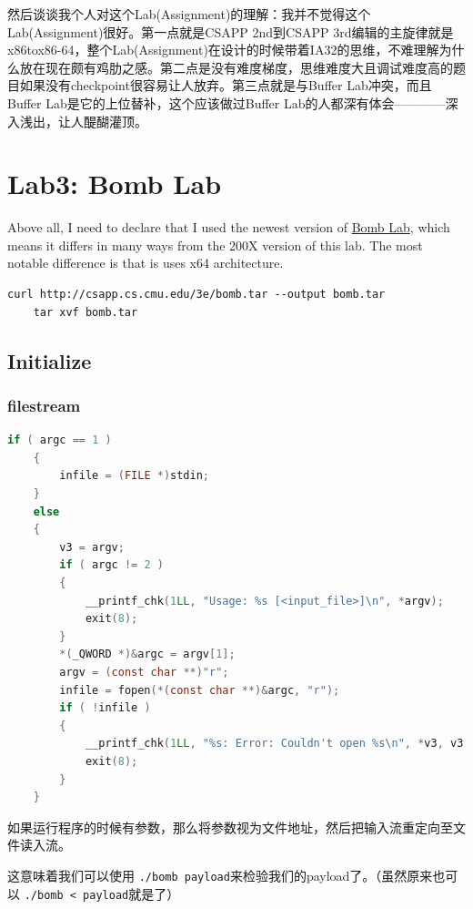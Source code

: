 \documentclass[a4pper,12pt,onecolumn]{article}
\begin{document}
然后谈谈我个人对这个Lab(Assignment)的理解：我并不觉得这个Lab(Assignment)很好。第一点就是CSAPP 2nd到CSAPP 3rd编辑的主旋律就是x86tox86-64，整个Lab(Assignment)在设计的时候带着IA32的思维，不难理解为什么放在现在颇有鸡肋之感。第二点是没有难度梯度，思维难度大且调试难度高的题目如果没有checkpoint很容易让人放弃。第三点就是与Buffer Lab冲突，而且Buffer Lab是它的上位替补，这个应该做过Buffer Lab的人都深有体会————深入浅出，让人醍醐灌顶。

\section{Lab3: Bomb Lab}

Above all, I need to declare that I used the newest version of \href{http://csapp.cs.cmu.edu/3e/bomblab.pdf}{Bomb Lab}, which means it differs in many ways from the 200X version of this lab. The most notable difference is that is uses x64 architecture.

\begin{lstlisting}[style=DOS]
    curl http://csapp.cs.cmu.edu/3e/bomb.tar --output bomb.tar
    tar xvf bomb.tar
\end{lstlisting}

\subsection{Initialize}

\subsubsection{filestream}

\begin{lstlisting}[language=c]
    if ( argc == 1 )
    {
        infile = (FILE *)stdin;
    }
    else
    {
        v3 = argv;
        if ( argc != 2 )
        {
            __printf_chk(1LL, "Usage: %s [<input_file>]\n", *argv);
            exit(8);
        }
        *(_QWORD *)&argc = argv[1];
        argv = (const char **)"r";
        infile = fopen(*(const char **)&argc, "r");
        if ( !infile )
        {
            __printf_chk(1LL, "%s: Error: Couldn't open %s\n", *v3, v3[1]);
            exit(8);
        }
    }
\end{lstlisting}

如果运行程序的时候有参数，那么将参数视为文件地址，然后把输入流重定向至文件读入流。

这意味着我们可以使用 \texttt{./bomb payload}来检验我们的payload了。（虽然原来也可以 \texttt{./bomb < payload}就是了）
\end{document}
